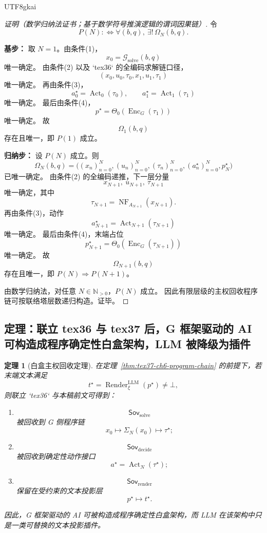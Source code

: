 \documentclass[12pt]{article}
\newtheorem{theorem}{定理}[section]
\newcommand{\Render}{\operatorname{Render}}
\begin{document}
\begin{CJK*}{UTF8}{gkai}
\begin{proof}[证明（数学归纳法证书；基于数学符号推演逻辑的谓词因果链）]
令
\[
  P(N)
  :
  \Longleftrightarrow
  \forall (b,q),\ \exists!\,\Omega_N(b,q).
\]

\textbf{基步：}
取 $N=1$。由条件(1)，
\[
  x_0=\mathcal{G}_{\mathrm{solve}}(b,q)
\]
唯一确定。
由条件(2) 以及 `tex36` 的全编码求解链口径，
\[
  (x_0,u_0,\tau_0,x_1,u_1,\tau_1)
\]
唯一确定。
再由条件(3)，
\[
  a_0^\star=\operatorname{Act}_0(\tau_0),
  \qquad
  a_1^\star=\operatorname{Act}_1(\tau_1)
\]
唯一确定。
最后由条件(4)，
\[
  p^\star=\Theta_0(\operatorname{Enc}_G(\tau_1))
\]
唯一确定。
故
\[
  \Omega_1(b,q)
\]
存在且唯一，即 $P(1)$ 成立。

\textbf{归纳步：}
设 $P(N)$ 成立。则
\[
  \Omega_N(b,q)
  =
  \bigl(
    (x_n)_{n=0}^{N},
    (u_n)_{n=0}^{N},
    (\tau_n)_{n=0}^{N},
    (a_n^\star)_{n=0}^{N},
    p^\star_N
  \bigr)
\]
已唯一确定。
由条件(2) 的全编码递推，下一层分量
\[
  x_{N+1},\ u_{N+1},\ \tau_{N+1}
\]
唯一确定，其中
\[
  \tau_{N+1}=\operatorname{NF}_{A_{N+1}}(x_{N+1}).
\]
再由条件(3)，动作
\[
  a_{N+1}^\star=\operatorname{Act}_{N+1}(\tau_{N+1})
\]
唯一确定。
最后由条件(4)，末端占位
\[
  p^\star_{N+1}
  =
  \Theta_0(\operatorname{Enc}_G(\tau_{N+1}))
\]
唯一确定。
故
\[
  \Omega_{N+1}(b,q)
\]
存在且唯一，即 $P(N)\Rightarrow P(N+1)$。

由数学归纳法，对任意 $N\in\mathbb{N}_{>0}$，$P(N)$ 成立。
因此有限层级的主权回收程序链可按联络塔层数递归构造。证毕。
\end{proof}

\subsection{定理：联立 tex36 与 tex37 后，G 框架驱动的 AI 可构造成程序确定性白盒架构，LLM 被降级为插件}
\label{subsec:tex37-ch6-theorem}

\begin{theorem}[白盒主权回收定理]
\label{thm:tex37-ch6-whitebox-plugin}
在定理~\ref{thm:tex37-ch6-program-chain} 的前提下，若末端文本满足
\[
  t^\star=\Render^{\mathrm{LLM}}_\xi(p^\star)\neq\bot,
\]
则联立 `tex36` 与本稿前文可得到：
\begin{enumerate}
  \item
  \[
    \mathsf{Sov}_{\mathrm{solve}}
  \]
  被回收到 G 侧程序链
  \[
    x_0\mapsto \Sigma_N(x_0)\mapsto \tau^\star;
  \]
  \item
  \[
    \mathsf{Sov}_{\mathrm{decide}}
  \]
  被回收到确定性动作接口
  \[
    a^\star=\operatorname{Act}_N(\tau^\star);
  \]
  \item
  \[
    \mathsf{Sov}_{\mathrm{render}}
  \]
  保留在受约束的文本投影层
  \[
    p^\star\mapsto t^\star.
  \]
\end{enumerate}
因此，G 框架驱动的 AI 可被构造成程序确定性白盒架构，而 LLM 在该架构中只是一类可替换的文本投影插件。
\end{theorem}


\end{CJK*}
\end{document}
